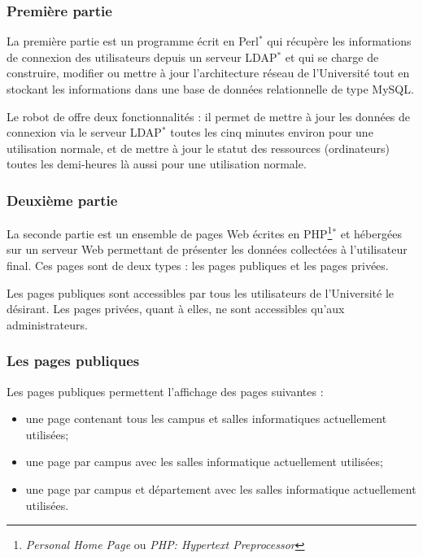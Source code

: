 \subsubsection{Premi\`ere partie}

La premi\`ere partie est un programme \'ecrit en Perl$^*$ qui r\'ecup\`ere les informations de connexion des utilisateurs depuis un serveur LDAP$^*$ et qui se charge de construire, modifier ou mettre \`a jour l'architecture r\'eseau de l'Universit\'e tout en stockant les informations dans une base de donn\'ees relationnelle de type MySQL.

Le robot de \Yuukou{} offre deux fonctionnalit\'es : il permet de mettre \`a jour les donn\'ees de connexion via le serveur LDAP$^*$ toutes les cinq minutes environ pour une utilisation normale, et de mettre \`a jour le statut des ressources (ordinateurs) toutes les demi-heures l\`a aussi pour une utilisation normale.

\subsubsection{Deuxi\`eme partie}

La seconde partie est un ensemble de pages Web \'ecrites en PHP\protect\footnote{\textit{Personal Home Page} ou \textit{PHP: Hypertext Preprocessor}}$^*$ et h\'eberg\'ees sur un serveur Web permettant de pr\'esenter les donn\'ees collect\'ees \`a l'utilisateur final.
Ces pages sont de deux types : les pages publiques et les pages priv\'ees.

Les pages publiques sont accessibles par tous les utilisateurs de l'Universit\'e le d\'esirant.
Les pages priv\'ees, quant \`a elles, ne sont accessibles qu'aux administrateurs.

\subsubsection{Les pages publiques}

\noindent Les pages publiques permettent l'affichage des pages suivantes :

\begin{itemize}
	\item une page contenant tous les campus et salles informatiques actuellement utilis\'ees;
	\item une page par campus avec les salles informatique actuellement utilis\'ees;
	\item une page par campus et d\'epartement avec les salles informatique actuellement utilis\'ees.

\end{itemize}

